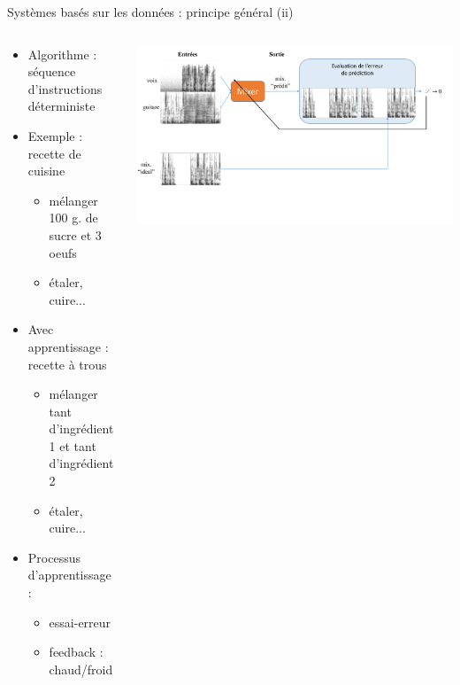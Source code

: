 \documentclass[9pt, aspectratio=169]{beamer}
\begin{document}
\begin{frame}{Systèmes basés sur les données : principe général (ii)} %

\begin{columns}
    \begin{column}{0.55\textwidth}
\begin{itemize}
	\item Algorithme : séquence d'instructions déterministe
	\item Exemple : recette de cuisine
	\begin{itemize}
		\item mélanger 100 g. de sucre et 3 oeufs
		\item étaler, cuire...
	\end{itemize}
	\item Avec apprentissage : recette à trous
	\begin{itemize}
		\item mélanger tant d'ingrédient 1 et tant d'ingrédient 2
		\item étaler, cuire...
	\end{itemize}
	\item Processus d'apprentissage :
	\begin{itemize}
		\item essai-erreur
		\item feedback : chaud/froid
	\end{itemize}
\end{itemize}
\end{column}
    \begin{column}{0.45\textwidth}
    \includegraphics[width=\textwidth, page=1]{fig/schemas.pdf}
    \end{column}
\end{columns}
    
\end{frame}
\end{document}
